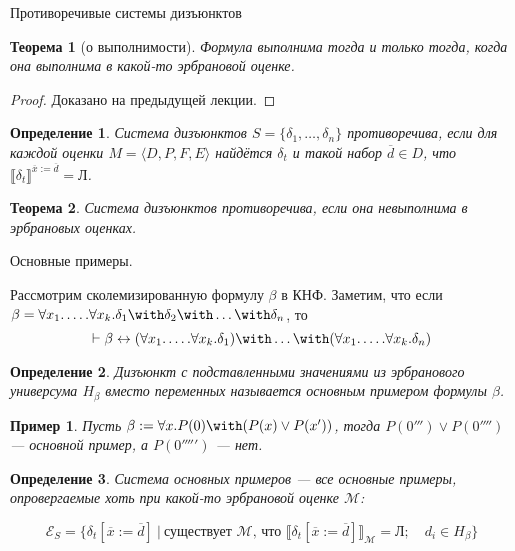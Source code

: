 \documentclass[aspectratio=169]{beamer}
\newtheorem{thm}{Теорема}[section]
\newtheorem{dfn}{Определение}[section]
\newtheorem{exm}{Пример}[section]
\begin{document}
\begin{frame}{Противоречивые системы дизъюнктов}
\begin{thm}[о выполнимости]Формула выполнима тогда и только тогда, когда она выполнима в какой-то эрбрановой оценке.\end{thm}
\begin{proof}Доказано на предыдущей лекции.\end{proof}

\begin{dfn}Система дизъюнктов $S = \{\delta_1,\dots,\delta_n\}$ противоречива,
если для каждой оценки $M = \langle D,P,F,E \rangle$ найдётся $\delta_t$ и такой набор $\overline{d} \in D$,
что $\llbracket\delta_t\rrbracket^{\overline{x} := \overline{d}} = \text{Л}$.
\end{dfn}

\begin{thm}Система дизъюнктов противоречива, если она невыполнима в эрбрановых оценках.\end{thm}
\end{frame}

\begin{frame}{Основные примеры.}

Рассмотрим сколемизированную формулу $\beta$ в КНФ. Заметим, что если $\beta = \forall x_1.\dots.\forall x_k.\delta_1\with\delta_2\with\dots\with\delta_n$,
то $$\vdash \beta \leftrightarrow (\forall x_1.\dots.\forall x_k.\delta_1)\with\dots\with(\forall x_1.\dots.\forall x_k.\delta_n)$$

\begin{dfn}
Дизъюнкт с подставленными значениями из эрбранового универсума $H_\beta$ вместо переменных называется основным примером формулы $\beta$.
\end{dfn}
\begin{exm}Пусть $\beta := \forall x.P(0) \with (P(x)\vee P(x'))$, тогда $P(0''')\vee P(0'''')$ --- основной пример, а $P(0''''')$ --- нет.
\end{exm}

\begin{dfn}Система основных примеров --- все основные примеры, опровергаемые хоть при какой-то эрбрановой оценке $\mathcal{M}$:

\vspace{-0.3cm}
$$\mathcal{E}_S = \{ \delta_t[\overline{x} := \overline{d}]\ |\ \text{существует }\mathcal{M}\text{, что } \llbracket \delta_t[\overline{x} := \overline{d}] \rrbracket_\mathcal{M}=\text{Л};\quad d_i \in H_\beta\}$$
\end{dfn}

\end{frame}
\end{document}
